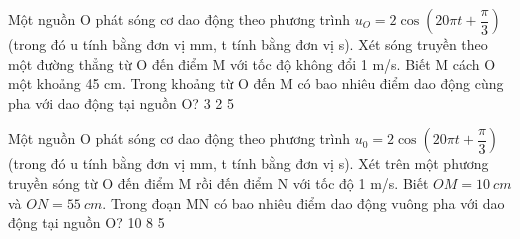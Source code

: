 \begin{vidu}%
Một nguồn O phát sóng cơ dao động theo phương trình $u_O = 2\cos(20\pi t + \dfrac{\pi}{3})$ (trong đó u tính bằng đơn vị mm, t tính bằng đơn vị s). Xét sóng truyền theo một đường thẳng từ O đến điểm M với tốc độ không đổi 1 m/s. Biết M cách O một khoảng 45 cm. Trong khoảng từ O đến M có bao nhiêu điểm dao động cùng pha với dao động tại nguồn O?
\choice
{}
{3}
{2}
{5}
\end{vidu} 
\begin{vidu}%
Một nguồn O phát sóng cơ dao động theo phương trình $u_0=2\cos\left(20\pi t+\dfrac{\pi}{3}\right)$(trong đó u tính bằng đơn vị mm, t tính bằng đơn vị s). Xét trên một phương truyền sóng từ O đến điểm M rồi đến điểm N với tốc độ 1 m/s. Biết $OM=10\ cm$ và $ON = 55\ cm$. Trong đoạn MN có bao nhiêu điểm dao động vuông pha với dao động tại nguồn O?
\choice
{10}
{8}
{}
{5}
\end{vidu} 

